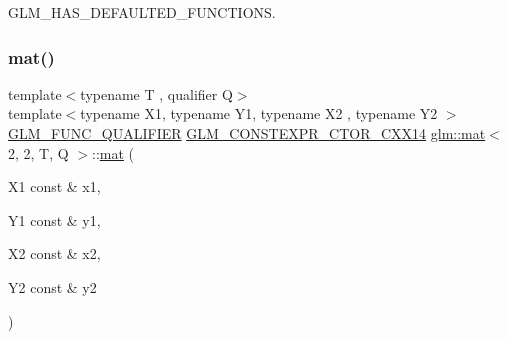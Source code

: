G\+L\+M\+\_\+\+H\+A\+S\+\_\+\+D\+E\+F\+A\+U\+L\+T\+E\+D\+\_\+\+F\+U\+N\+C\+T\+I\+O\+NS. 

\mbox{\label{structglm_1_1mat_3_012_00_012_00_01_t_00_01_q_01_4_a2648b2f4eae0dbdc87ebc1438ef45719}} 
\subsubsection{\texorpdfstring{mat()}{mat()}\hspace{0.1cm}{\footnotesize\ttfamily [19/21]}}
{\footnotesize\ttfamily template$<$typename T , qualifier Q$>$ \\
template$<$typename X1, typename Y1, typename X2 , typename Y2 $>$ \\
\mbox{\hyperlink{setup_8hpp_a33fdea6f91c5f834105f7415e2a64407}{G\+L\+M\+\_\+\+F\+U\+N\+C\+\_\+\+Q\+U\+A\+L\+I\+F\+I\+ER}} \mbox{\hyperlink{setup_8hpp_a0900f9145e68bf6061b6f5e7be3fa751}{G\+L\+M\+\_\+\+C\+O\+N\+S\+T\+E\+X\+P\+R\+\_\+\+C\+T\+O\+R\+\_\+\+C\+X\+X14}} \mbox{\hyperlink{structglm_1_1mat}{glm\+::mat}}$<$ 2, 2, T, Q $>$\+::\mbox{\hyperlink{structglm_1_1mat}{mat}} (\begin{DoxyParamCaption}\item[{X1 const \&}]{x1,  }\item[{Y1 const \&}]{y1,  }\item[{X2 const \&}]{x2,  }\item[{Y2 const \&}]{y2 }\end{DoxyParamCaption})}

\mbox{\label{structglm_1_1mat_3_012_00_012_00_01_t_00_01_q_01_4_a57de0b97d240ad056c3aa54425eb8244}} 
